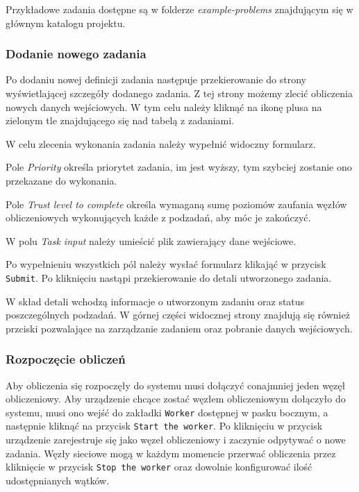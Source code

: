 \documentclass[a4paper,11pt,twoside]{report}
\theoremstyle{definition}
\begin{document}
		Przykładowe zadania dostępne są w folderze \textit{example-problems} znajdującym się w głównym katalogu projektu.
		
		
		\subsubsection{Dodanie nowego zadania}
		\label{distributed-task-add-guide}
		
		Po dodaniu nowej definicji zadania następuje przekierowanie do strony wyświetlającej szczegóły dodanego zadania. 
		Z tej strony możemy zlecić obliczenia nowych danych wejściowych. W tym celu należy kliknąć na ikonę plusa na zielonym tle znajdującego się nad tabelą z zadaniami.
		
		
		W celu zlecenia wykonania zadania należy wypełnić widoczny formularz. 
		
		
		Pole \textit{Priority} określa priorytet zadania, im jest wyższy, tym szybciej zostanie ono przekazane do wykonania.
		
		Pole \textit{Trust level to complete} określa wymaganą sumę poziomów zaufania węzłów obliczeniowych wykonujących każde z podzadań, aby móc je zakończyć. 
		
		W polu \textit{Task input} należy umieścić plik zawierający dane wejściowe.
		
		Po wypełnieniu wszystkich pól należy wysłać formularz klikająć w przycisk \texttt{Submit}. Po kliknięciu nastąpi przekierowanie do detali utworzonego zadania. 
		  
		
		W skład detali wchodzą informacje o utworzonym zadaniu oraz status poszczególnych podzadań. W górnej części widocznej strony znajdują się również przciski pozwalające na zarządzanie zadaniem oraz pobranie danych wejściowych.
		
		\subsubsection{Rozpoczęcie obliczeń}
		
		Aby obliczenia się rozpoczęły do systemu musi dołączyć conajmniej jeden węzęł obliczeniowy. Aby urządzenie chcące zostać węzłem obliczeniowym dołączyło do systemu, musi ono wejść do zakładki \texttt{Worker} dostępnej w pasku bocznym, a następnie kliknąć na przycisk \texttt{Start the worker}. Po kliknięciu w przycisk urządzenie zarejestruje się jako węzeł obliczeniowy i zaczynie odpytywać o nowe zadania. Węzły sieciowe mogą w każdym momencie przerwać obliczenia przez kliknięcie w przycisk \texttt{Stop the worker} oraz dowolnie konfigurować ilość udostępnianych wątków. 
		
\end{document}
